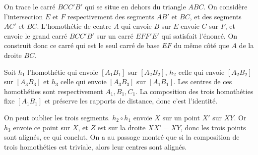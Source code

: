 \begin{sol}
On trace le carré $BCC'B'$ qui se situe en dehors du triangle $ABC$. On considère l'intersection $E$ et $F$ respectivement des segments $AB'$ et $BC$, et des segments $AC'$ et $BC$. L'homothétie de centre $A$ qui envoie $B$ sur $E$ envoie $C$ sur $F$, et envoie le grand carré $BCC'B'$ sur un carré $EFF'E'$ qui satisfait l'énoncé. On construit donc ce carré qui est le seul carré de base $EF$ du même côté que $A$ de la droite $BC$.
\end{sol}


\begin{sol}
Soit $h_1$ l'homothétie qui envoie $[A_1B_1]$ sur $[A_2B_2]$, $h_2$ celle qui envoie $[A_2B_2]$ sur $[A_3B_3]$ et $h_3$ celle qui envoie $[A_3B_3]$ sur $[A_1B_1]$. Les centres de ces homothéties sont respectivement $A_1,B_1,C_1$. La composition des trois homothéties fixe $[A_1B_1]$ et préserve les rapports de distance, donc c'est l'identité.

\medskip

On peut oublier les trois segments. $h_2\circ h_1$ envoie $X$ sur un point $X'$ sur $XY$. Or $h_3$ envoie ce point sur $X$, et $Z$ est sur la droite $XX'=XY$, donc les trois points sont alignés, ce qui conclut. On a au passage montré que si la composition de trois homothéties est triviale, alors leur centres sont alignés.
\end{sol}



